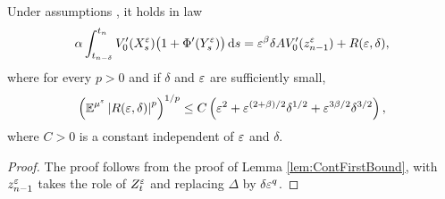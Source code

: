 \documentclass[10pt]{article}
\begin{document}
\begin{lemma}\label{lem:DiscFirstBound} Under assumptions , it holds in law
	\begin{equation}
		\alpha\int_{t_{n-\delta}}^{t_n} V_0'(X^\varepsilon_s)\big(1 + \Phi'(Y^\varepsilon_s)\big)\,\mathrm{d} s = \varepsilon^\beta \delta A V_0'(z^\varepsilon_{n-1}) + R(\varepsilon, \delta),
	\end{equation}
	where for every $p > 0$ and if $\delta$ and $\varepsilon$ are sufficiently small,
	\begin{equation}
		\left(\operatorname{\mathbb{E}}^{\mu^\varepsilon}\left\lvert R(\varepsilon, \delta)\right\rvert^p\right)^{1/p}\leq C\left(\varepsilon^2 + \varepsilon^{(2+\beta)/2}\delta^{1/2} + \varepsilon^{3\beta/2} \delta^{3/2} \right),
	\end{equation}
	where $C > 0$ is a constant independent of $\varepsilon$ and $\delta$.
\end{lemma}
\begin{proof} The proof follows from the proof of Lemma \ref{lem:ContFirstBound}, with $z_{n-1}^\varepsilon$ takes the role of $Z_t^\varepsilon$ and replacing $\Delta$ by $\delta\varepsilon^q$.
\end{proof}
\end{document}
